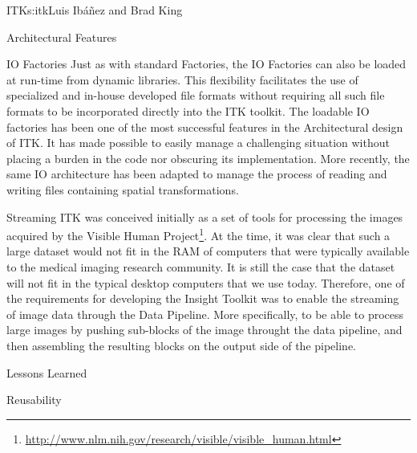 \begin{aosachapter}{ITK}{s:itk}{Luis Ib\'{a}\~{n}ez and Brad King}
\begin{aosasect1}{Architectural Features}
\begin{aosasect2}{IO Factories}
Just as with standard Factories, the IO Factories can also be loaded at
run-time from dynamic libraries. This flexibility facilitates the use of
specialized and in-house developed file formats without requiring all such file
formats to be incorporated directly into the ITK toolkit. The loadable IO
factories has been one of the most successful features in the Architectural
design of ITK. It has made possible to easily manage a challenging situation
without placing a burden in the code nor obscuring its implementation. More
recently, the same IO architecture has been adapted to manage the process of
reading and writing files containing spatial transformations.

\end{aosasect2}

\begin{aosasect2}{Streaming}
ITK was conceived initially as a set of tools for processing the images
acquired by the Visible Human
Project\footnote{\url{http://www.nlm.nih.gov/research/visible/visible_human.html}}.
At the time, it was clear that such a large dataset would not fit in the RAM of
computers that were typically available to the medical imaging research
community. It is still the case that the dataset will not fit in the typical
desktop computers that we use today. Therefore, one of the requirements for
developing the Insight Toolkit was to enable the streaming of image data
through the Data Pipeline. More specifically, to be able to process large
images by pushing sub-blocks of the image throught the data pipeline, and then
assembling the resulting blocks on the output side of the pipeline.
\end{aosasect2}

\end{aosasect1}

\begin{aosasect1}{Lessons Learned}

\begin{aosasect2}{Reusability}
\end{aosasect2}


\end{aosasect1}
\end{aosachapter}
